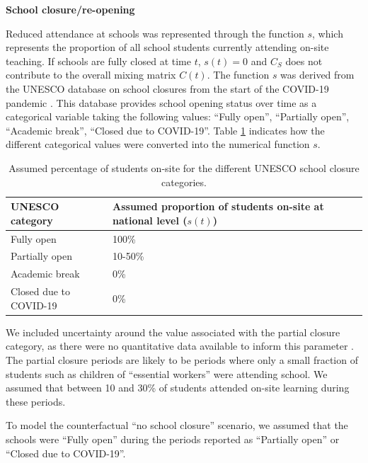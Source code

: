 \vspace{5pt}
\textbf{School closure/re-opening}

Reduced attendance at schools was represented through the function $s$, which represents the proportion of all school students 
currently attending on-site teaching. If schools are fully closed at time $t$, \(s(t)=0\) and \(C_{S}\) does not contribute to the overall 
mixing matrix \(C(t)\). 
The function $s$ was derived from the UNESCO database on school closures from the start of the COVID-19 pandemic \cite{unesco2023}.
This database provides school opening status over time as a categorical variable taking the following values: ``Fully open'', ``Partially open'', ``Academic break'', ``Closed due to COVID-19''.
Table \ref{tab:unesco_categories} indicates how the different categorical values were converted into the numerical function $s$.

\vspace{5pt}
\begin{table}[ht]  
  \begin{center}
    \caption{Assumed percentage of students on-site for the different UNESCO school closure categories.}
    \label{tab:unesco_categories}
    \begin{tabular}{p{5cm} | p{7cm}}
          \hline
          \textbf{UNESCO category} & \textbf{Assumed proportion of students on-site at national level ($s(t)$)} \\
          \hline
          Fully open & 100\% \\
          Partially open & 10-50\% \\
          Academic break & 0\% \\
          Closed due to COVID-19 & 0\% \\
          \hline
      \end{tabular}
    \end{center}
  \end{table}

We included uncertainty around the value associated with the partial closure category, as there were no quantitative data available to 
inform this parameter \cite{unesco2023}. The partial closure periods are likely to be periods where only a small fraction of students such as children of ``essential workers'' were 
attending school. We assumed that between 10 and 30\% of students attended on-site learning during these periods.

To model the counterfactual ``no school closure'' scenario, we assumed that the schools were ``Fully open'' during the
periods reported as ``Partially open'' or ``Closed due to COVID-19''.

